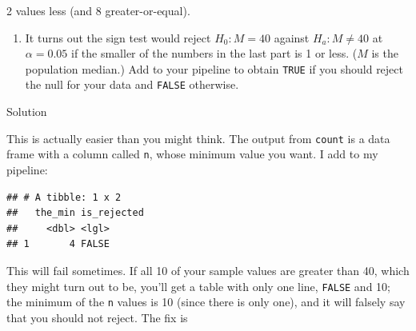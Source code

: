 \documentclass[]{tufte-book}
\newenvironment{Shaded}{}{}
\newcommand{\DataTypeTok}[1]{\textcolor[rgb]{0.56,0.13,0.00}{#1}}
\newcommand{\DecValTok}[1]{\textcolor[rgb]{0.25,0.63,0.44}{#1}}
\newcommand{\KeywordTok}[1]{\textcolor[rgb]{0.00,0.44,0.13}{\textbf{#1}}}
\newcommand{\NormalTok}[1]{#1}
\newcommand{\OperatorTok}[1]{\textcolor[rgb]{0.40,0.40,0.40}{#1}}
\newcommand{\StringTok}[1]{\textcolor[rgb]{0.25,0.44,0.63}{#1}}
\providecommand{\tightlist}{%
  \setlength{\itemsep}{0pt}\setlength{\parskip}{0pt}}
\theoremstyle{definition}
\theoremstyle{definition}
\theoremstyle{definition}
\theoremstyle{remark}
\begin{document}
2 values less (and 8 greater-or-equal).

\begin{enumerate}
\def\labelenumi{(\alph{enumi})}
\setcounter{enumi}{3}
\tightlist
\item
  It turns out the sign test would reject \(H_0: M=40\) against
  \(H_a: M \ne 40\) at \(\alpha=0.05\) if the smaller of the numbers in
  the last part is 1 or less. (\(M\) is the population median.) Add to
  your pipeline to obtain \texttt{TRUE} if you should reject the null
  for your data and \texttt{FALSE} otherwise.
\end{enumerate}

Solution

This is actually easier than you might think. The output from
\texttt{count} is a data frame with a column called \texttt{n}, whose
minimum value you want. I add to my pipeline:

\begin{Shaded}
\end{Shaded}

\begin{verbatim}
## # A tibble: 1 x 2
##   the_min is_rejected
##     <dbl> <lgl>      
## 1       4 FALSE
\end{verbatim}

This will fail sometimes. If all 10 of your sample values are greater
than 40, which they might turn out to be, you'll get a table with only
one line, \texttt{FALSE} and 10; the minimum of the \texttt{n} values is
10 (since there is only one), and it will falsely say that you should
not reject. The fix is

\begin{Shaded}
\end{Shaded}
\end{document}
